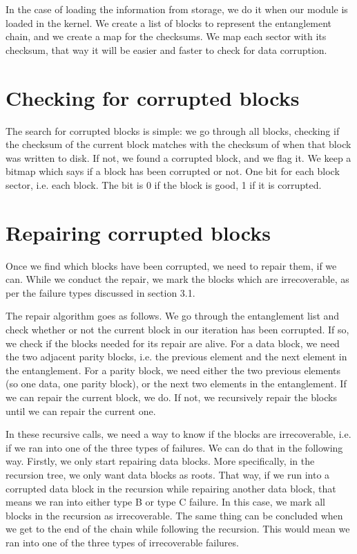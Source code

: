 \documentclass[a4paper,11pt,oneside]{report}
\begin{document}
In the case of loading the information from storage, we do it when our module is loaded in the kernel. We create a list of blocks to represent the entanglement chain, and we create a map for the checksums. We map each sector with its checksum, that way it will be easier and faster to check for data corruption. 

\section{Checking for corrupted blocks}
The search for corrupted blocks is simple: we go through all blocks, checking if the checksum of the current block matches with the checksum of when that block was written to disk. If not, we found a corrupted block, and we flag it. We keep a bitmap which says if a block has been corrupted or not. One bit for each block sector, i.e. each block. The bit is 0 if the block is good, 1 if it is corrupted. 

\section{Repairing corrupted blocks}
Once we find which blocks have been corrupted, we need to repair them, if we can. While we conduct the repair, we mark the blocks which are irrecoverable, as per the failure types discussed in section 3.1. 

The repair algorithm goes as follows. We go through the entanglement list and check whether or not the current block in our iteration has been corrupted. If so, we check if the blocks needed for its repair are alive. For a data block, we need the two adjacent parity blocks, i.e. the previous element and the next element in the entanglement. For a parity block, we need either the two previous elements (so one data, one parity block), or the next two elements in the entanglement. If we can repair the current block, we do. If not, we recursively repair the blocks until we can repair the current one. 

In these recursive calls, we need a way to know if the blocks are irrecoverable, i.e. if we ran into one of the three types of failures. We can do that in the following way. Firstly, we only start repairing data blocks. More specifically, in the recursion tree, we only want data blocks as roots. That way, if we run into a corrupted data block in the recursion while repairing another data block, that means we ran into either type B or type C failure. In this case, we mark all blocks in the recursion as irrecoverable. The same thing can be concluded when we get to the end of the chain while following the recursion. This would mean we ran into one of the three types of irrecoverable failures.  
\end{document}
